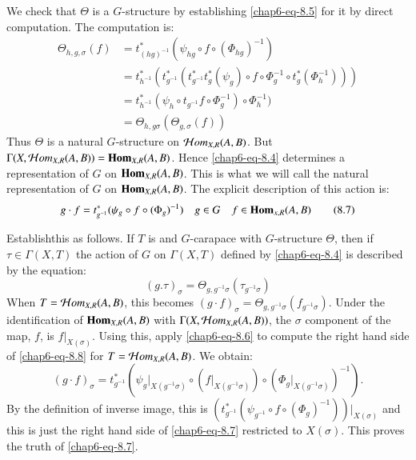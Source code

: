 We check that $\Theta$ is a $G$-structure by establishing \ref{chap6-eq-8.5} for it by direct computation. The computation is:
\begin{align*}
\Theta_{h, {g}, \sigma}(f) &= t_{(h {g})^{-1}}^{*}(\psi_{h {g}} \circ f \circ (\Phi_{h {g}})^{-1})\\
& = t_{h^{-1}}^{*}(t_{{g^{-1}}}^{*}(t_{{g^{-1}}}^{*} t_{{g}}^{*} (\psi_{{g}}) \circ f \circ \Phi_{{g}}^{-1} \circ t_{{g}}^{*}(\Phi_{h}^{-1})))\\
& = t_{h^{-1}}^{*}(\psi_{h} \circ t_{{g}^{-1}} f \circ \Phi_{{g}}^{-1}) \circ \Phi_{h}^{-1})\\
& = \Theta_{h,{g}\sigma}(\Theta_{{g}, \sigma}(f))
\end{align*}
Thus $\Theta$ is a natural $G$-structure on $\mathcal{H} om_{X, R}(A, B)$. But\break $\Gamma(X, \mathcal{H} om_{X, R}(A, B)) = \operatorname{\mathbf{Hom}}_{X, R}(A, B)$. Hence \ref{chap6-eq-8.4} determines a representation of $G$ on $\operatorname{\mathbf{Hom}}_{X, R}(A, B)$. This is what we will call the natural representation of $G$ on $\operatorname{\mathbf{Hom}}_{X, R}(A, B)$. The explicit description of this action is:
\begin{equation*}\label{chap6-eq-8.7}
{g} \cdot f = t_{{g}^{-1}}^{*}(\psi_{{g}} \circ f \circ (\Phi_{{g}})^{-1}) \quad {g} \in G \quad f\in \operatorname{\mathbf{Hom}}_{x, R}(A, B)\tag{8.7}
\end{equation*}

Establish\pageoriginale this as follows. If $T$ is and $G$-carapace with $G$-structure $\Theta$, then if $\tau \in \Gamma (X, T)$ the action of $G$ on $\Gamma(X, T)$ defined by \ref{chap6-eq-8.4} is described by the equation:
\begin{equation*}\label{chap6-eq-8.8}
({g}. \tau)_{\sigma} = \Theta_{{g}, {g}^{-1}\sigma}(\tau_{{g}^{-1}\sigma})\tag{8.8}
\end{equation*}
When $T=\mathcal{H} om_{X, R}(A, B)$, this becomes $({g \cdot f})_{\sigma} = \Theta_{{g}, {g}^{-1}\sigma}(f_{{g}^{-1}\sigma})$. Under the identification of $\operatorname{\mathbf{Hom}}_{X, R}(A, B)$ with
$\Gamma(X, \mathcal{H} om_{X, R}(A, B))$, the $\sigma$ component of the map, $f$, is $f|_{X(\sigma)}$. Using this, apply
\ref{chap6-eq-8.6} to compute the right hand side of \ref{chap6-eq-8.8} for $T= \mathcal{H} om_{X, R}(A, B)$. We obtain:
$$
({g} \cdot f)_{\sigma} = t_{{g}^{-1}}^{*}(\psi_{{g}}|_{X(g^{-1}\sigma)} \circ (f|_{X({g}^{-1}\sigma)})\circ (\Phi_{{g}}|_{X({g}^{-1}\sigma)})^{-1}).
$$
By the definition of inverse image, this is $(t_{{g}^{-1}}^{*}(\psi_{{g}^{-1}} \circ f \circ (\Phi_{{g}})^{-1}))|_{X(\sigma)}$ and this is just the right hand side of \ref{chap6-eq-8.7} restricted to $X(\sigma)$. This proves the truth of \ref{chap6-eq-8.7}.

